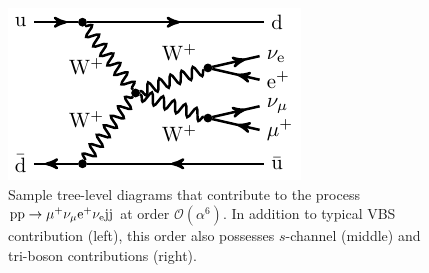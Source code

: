 \begin{figure}[t]
\begin{center}
          \includegraphics[width=0.30\linewidth]{feynman/LO_EW_5}
\end{center}
        \caption{Sample tree-level diagrams that contribute to the process $\text{p}\text{p}\to\mu^+\nu_\mu\text{e}^+\nu_{\text{e}}\text{j}\text{j}$ at order $\mathcal{O}{\left(\alpha^{6}\right)}$.
        In addition to typical VBS contribution (left), this order also possesses $s$-channel (middle) and tri-boson contributions (right). }
\label{diag:LO}
\end{figure}
